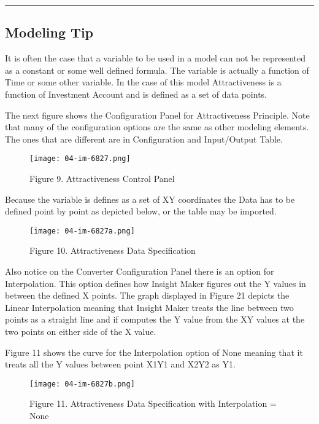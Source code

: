 \documentclass[]{memoir}
\let\Oldincludegraphics\includegraphics
\renewcommand{\includegraphics}[1]{\Oldincludegraphics[max size={\textwidth}{\textheight}]{#1}}
\begin{document}
\begin{center}\rule{3in}{0.4pt}\end{center}

\subsection{Modeling Tip}

It is often the case that a variable to be used in a model can not be
represented as a constant or some well defined formula. The variable is
actually a function of Time or some other variable. In the case of this
model Attractiveness is a function of Investment Account and is defined
as a set of data points.

The next figure shows the Configuration Panel for Attractiveness
Principle. Note that many of the configuration options are the same as
other modeling elements. The ones that are different are in
Configuration and Input/Output Table.

\begin{figure}[htbp]
\centering
\texttt{[image: 04-im-6827.png]}
\caption{Figure 9. Attractiveness Control Panel}
\end{figure}

Because the variable is defines as a set of XY coordinates the Data has
to be defined point by point as depicted below, or the table may be
imported.

\begin{figure}[htbp]
\centering
\texttt{[image: 04-im-6827a.png]}
\caption{Figure 10. Attractiveness Data Specification}
\end{figure}

Also notice on the Converter Configuration Panel there is an option for
Interpolation. This option defines how Insight Maker figures out the Y
values in between the defined X points. The graph displayed in Figure 21
depicts the Linear Interpolation meaning that Insight Maker treats the
line between two points as a straight line and if computes the Y value
from the XY values at the two points on either side of the X value.

Figure 11 shows the curve for the Interpolation option of None meaning
that it treats all the Y values between point X1Y1 and X2Y2 as Y1.

\begin{figure}[htbp]
\centering
\texttt{[image: 04-im-6827b.png]}
\caption{Figure 11. Attractiveness Data Specification with Interpolation
= None}
\end{figure}
\end{document}

